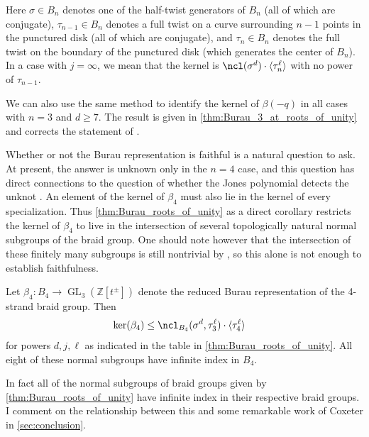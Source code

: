 \documentclass{amsart}
\begin{document}
\begin{theorem}
    Here $\sigma \in B_n$ denotes one of the half-twist generators of $B_n$ (all of which are conjugate), $\tau_{n-1} \in B_n$ denotes a full twist on a curve surrounding $n-1$ points in the punctured disk (all of which are conjugate), and $\tau_n \in B_n$ denotes the full twist on the boundary of the punctured disk (which generates the center of $B_n$). In a case with $j=\infty$, we mean that the kernel is $\ncl (\sigma^d) \cdot \langle \tau_n^\ell \rangle$ with no power of $\tau_{n-1}$.
    \end{theorem}

    We can also use the same method to identify the kernel of $\beta(-q)$ in all cases with $n=3$ and $d \geq 7$. The result is given in \cref{thm:Burau_3_at_roots_of_unity} and corrects the statement of \cite[Theorem 1.2]{Funar2014OnUnity}.

    Whether or not the Burau representation is faithful is a natural question to ask. At present, the answer is unknown only in the $n=4$ case, and this question has direct connections to the question of whether the Jones polynomial detects the unknot \cite{Bigelow2002DoesUnknot,Ito2015APolynomials}. An element of the kernel of $\beta_4$ must also lie in the kernel of every specialization. Thus \cref{thm:Burau_roots_of_unity} as a direct corollary restricts the kernel of $\beta_4$ to live in the intersection of several topologically natural normal subgroups of the braid group. One should note however that the intersection of these finitely many subgroups is still nontrivial by \cite[Lemma 2.1]{Long1986AGroups}, so this alone is not enough to establish faithfulness.
    
    \begin{corollary} \label{cor:Burau_4_kernel}
        Let $\beta_4:B_4 \to \operatorname{GL}_3(\mathbb{Z}[t^\pm])$ denote the reduced Burau representation of the 4-strand braid group. Then
        \begin{align*}
            \ker (\beta_4 )& \leq \ncl_{B_4}(\sigma^d,\tau_3^\ell ) \cdot \langle \tau_4^\ell \rangle
        \end{align*}
        for powers $d,j,\ell$ as indicated in the table in \cref{thm:Burau_roots_of_unity}. All eight of these normal subgroups have infinite index in $B_4$.
    \end{corollary}
    
    In fact all of the normal subgroups of braid groups given by \cref{thm:Burau_roots_of_unity} have infinite index in their respective braid groups. I comment on the relationship between this and some remarkable work of Coxeter \cite{Coxeter1959FactorGroup} in \cref{sec:conclusion}.
    
\end{document}

